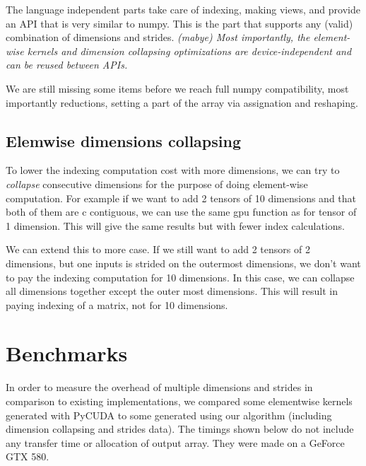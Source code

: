 \documentclass{article} %
\begin{document}
The language independent parts take care of indexing, making views, and provide an API that is very similar to numpy.  This is the part that supports any (valid) combination of dimensions and strides.  \emph{(mabye) Most importantly, the element-wise kernels and dimension collapsing optimizations are device-independent and can be reused between APIs.}

We are still missing some items before we reach full numpy compatibility, most importantly reductions, setting a part of the array via assignation and reshaping.

\subsection{Elemwise dimensions collapsing}
To lower the indexing computation cost with more dimensions, we can
try to \emph{collapse} consecutive dimensions for the purpose of doing
element-wise computation. For example if we want to add 2 tensors of
10 dimensions and that both of them are c contiguous, we can use the
same gpu function as for tensor of 1 dimension. This will give the
same results but with fewer index calculations.

We can extend this to more case. If we still want to add 2 tensors of
2 dimensions, but one inputs is strided on the outermost dimensions,
we don't want to pay the indexing computation for 10 dimensions. In
this case, we can collapse all dimensions together except the outer
most dimensions. This will result in paying indexing of a matrix, not
for 10 dimensions.

\section{Benchmarks}

In order to measure the overhead of multiple dimensions and strides in comparison to existing implementations, we compared some elementwise kernels generated with PyCUDA to some generated using our algorithm (including dimension collapsing and strides data).
The timings shown below do not include any transfer time or allocation of output array.
They were made on a GeForce GTX 580.
\end{document}
